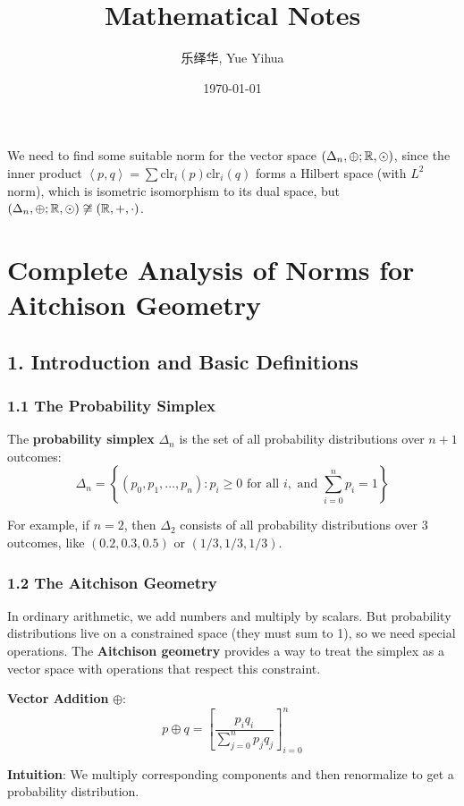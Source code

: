 \documentclass{amsart}
\author{乐绎华, Yue Yihua}
\date{\today}
\title{Mathematical Notes}
\let\originalmathbb\mathbb
\renewcommand{\mathbb}[1]{%
    \ifstrequal{#1}{1}{\mathbbm{#1}}{\originalmathbb{#1}}%
}
\theoremstyle{plain}
\theoremstyle{definition}
\theoremstyle{remark}
\begin{document}
\maketitle
\tableofcontents

We need to find some suitable norm for the vector space $(\Delta _n,\oplus;\mathbb{R},\odot)$, since the inner product $\left< p,q \right>=\sum\text{clr}_i(p)\text{clr}_i(q)$ forms a Hilbert space (with $L^{2}$ norm), which is isometric isomorphism to its dual space, but $(\Delta _n,\oplus;\mathbb{R},\odot) \not\cong(\mathbb{R},+,\cdot)$.


\chapter{Complete Analysis of Norms for Aitchison Geometry}

\section{1. Introduction and Basic Definitions}

\subsection{1.1 The Probability Simplex}

The \textbf{probability simplex} $\Delta_n$ is the set of all probability distributions over $n+1$ outcomes:
\[
\Delta_n = \left\{(p_0, p_1, \ldots, p_n) : p_i \geq 0 \text{ for all } i, \text{ and } \sum_{i=0}^n p_i = 1\right\}
\]

For example, if $n=2$, then $\Delta_2$ consists of all probability distributions over 3 outcomes, like $(0.2, 0.3, 0.5)$ or $(1/3, 1/3, 1/3)$.

\subsection{1.2 The Aitchison Geometry}

In ordinary arithmetic, we add numbers and multiply by scalars. But probability distributions live on a constrained space (they must sum to 1), so we need special operations. The \textbf{Aitchison geometry} provides a way to treat the simplex as a vector space with operations that respect this constraint.

\textbf{Vector Addition} $\oplus$:
\[
p \oplus q = \left[ \frac{p_i q_i}{\sum_{j=0}^n p_j q_j} \right]_{i=0}^n
\]

\textbf{Intuition}: We multiply corresponding components and then renormalize to get a probability distribution.
\end{document}
